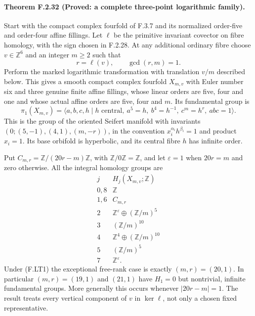 \paragraph{Theorem F.2.32 (Proved: a complete three-point logarithmic family).}
Start with the compact complex fourfold of F.3.7 and its
normalized order-five and order-four affine fillings.
Let $\ell$ be the primitive invariant covector on fibre
homology, with the sign chosen in F.2.28.
At any additional ordinary fibre choose
$v\in\mathbb Z^6$ and an integer $m\ge2$ such that
\[
 r=\ell(v),\qquad \gcd(r,m)=1.
\tag{F.LT1}
\]
Perform the marked logarithmic transformation with
translation $v/m$ described below.
This gives a smooth compact complex fourfold $X_{m,v}$
with Euler number six and three genuine finite affine
fillings, whose linear orders are five, four and one
and whose actual affine orders are five, four and $m$.
Its fundamental group is
\[
 \pi_1(X_{m,v})=
 \langle a,b,c,h\mid h\text{ central},\
   a^5=h,\ b^4=h^{-1},\ c^m=h^r,\ abc=1\rangle .
\tag{F.LT2}
\]
This is the group of the oriented Seifert manifold
with invariants
$(0;(5,-1),(4,1),(m,-r))$, in the convention
$x_i^{\alpha_i}h^{\beta_i}=1$ and product $x_i=1$.
Its base orbifold is hyperbolic, and its central fibre
$h$ has infinite order.

Put $C_{m,r}=\mathbb Z/(20r-m)\mathbb Z$, with
$\mathbb Z/0\mathbb Z=\mathbb Z$, and let
$\varepsilon=1$ when $20r=m$ and zero otherwise.
All the integral homology groups are
\[
\begin{array}{c|c}
j&H_j(X_{m,v};\mathbb Z)\\ \hline
0,8&\mathbb Z\\
1,6&C_{m,r}\\
2&\mathbb Z^\varepsilon\oplus(\mathbb Z/m)^5\\
3&(\mathbb Z/m)^{10}\\
4&\mathbb Z^4\oplus(\mathbb Z/m)^{10}\\
5&(\mathbb Z/m)^5\\
7&\mathbb Z^\varepsilon .
\end{array}
\tag{F.LT3}
\]
Under (F.LT1) the exceptional free-rank case is exactly
$(m,r)=(20,1)$.
In particular $(m,r)=(19,1)$ and $(21,1)$ have
$H_1=0$ but nontrivial, infinite fundamental groups.
More generally this occurs whenever $|20r-m|=1$.
The result treats every vertical component of $v$
in $\ker\ell$, not only a chosen fixed representative.

